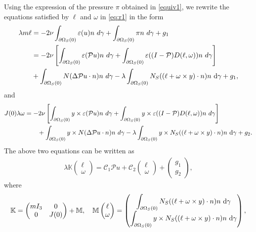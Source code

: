 \documentclass[12pt,a4paper,reqno]{amsart}
\theoremstyle{definition}
\theoremstyle{remark}
\numberwithin{equation}{section}
\newcommand{\oso}{\Omega_{S}(0)}
\newcommand{\ds}{\displaystyle}
\newcommand{\poso}{\partial\oso}
\newcommand{\mpp}{\mathcal{P}}
\newcommand{\dg}{{\rm d} \gamma}
\begin{document}
Using the expression of the pressure $\pi$ obtained in \eqref{equiv1}, we rewrite the equations satisfied by $\ell$ and $\omega$ in \eqref{eq:r1} in the form
\begin{align*}
\lambda m \ell &= - 2\nu \int_{\poso} \varepsilon(u)n \ d\gamma + \int_{\partial \Omega_{S}(0)}  \pi n \ d\gamma  + g_{1} \\
& = -2\nu \left[\int_{\poso} \varepsilon(\mpp u) n \ d\gamma + \int_{\poso} \varepsilon((I - \mpp) D (\ell,\omega))n \ d\gamma\right] \\
& + \int_{\partial\oso} N (\Delta \mpp u \cdot n)  n \ d\gamma  - \lambda \int_{\poso} N_{S} ((\ell + \omega \times y) \cdot n) n \ \dg  + g_{1},
\end{align*}
and
\begin{align*}
J(0) \lambda \omega  & = -2\nu \left[\int_{\poso} y \times \varepsilon(\mpp u)n \ d\gamma + \int_{\poso} y \times \varepsilon((I - \mpp) D (\ell,\omega))n \ d\gamma\right] \\
& \quad \quad + \int_{\partial\oso} y \times  N (\Delta \mpp u \cdot n)  n \ d\gamma  -  \lambda \int_{\poso} y \times N_{S} ((\ell + \omega \times y) \cdot n) n \ \dg   + g_{2}.
\end{align*}
The above two equations can be written as
\begin{align}
\lambda \mathbb{K} \begin{pmatrix}
\ell \\ \omega
\end{pmatrix} =
\mathcal{C}_{1} \mpp u + \mathcal{C}_{2} \begin{pmatrix}
\ell \\ \omega
\end{pmatrix} +
\begin{pmatrix}
g_{1} \\ g_{2}
\end{pmatrix},
\end{align}
where
\begin{align} \label{eq:adm}
\mathbb{K}  = \begin{pmatrix}
m I_{3} & 0 \\ 0 & J(0)
\end{pmatrix} + \mathbb{M}, \quad
\mathbb{M} \begin{pmatrix}
\ell \\ \omega
\end{pmatrix} =  \begin{pmatrix}
\ds \int_{\poso} N_{S} ((\ell + \omega \times y) \cdot n) n \ \dg \\ \ds \int_{\poso} y \times N_{S} ((\ell + \omega \times y) \cdot n) n \ \dg
\end{pmatrix},
\end{align}
\end{document}
